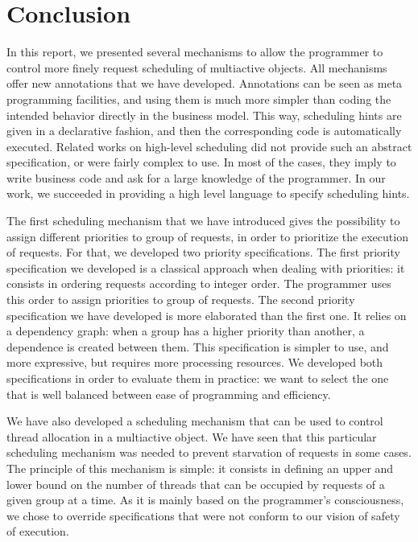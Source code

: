 \documentclass[11pt]{report}
\begin{document}
\section{Conclusion}
In this report, we presented several mechanisms to allow the programmer to control more finely request scheduling of multiactive objects. All mechanisms offer new annotations that we have developed. Annotations can be seen as meta programming facilities, and using them is much more simpler than coding the intended behavior directly in the business model. This way, scheduling hints are given in a declarative fashion, and then the corresponding code is automatically executed. Related works on high-level scheduling did not provide such an abstract specification, or were fairly complex to use. In most of the cases, they imply to write business code and ask for a large knowledge of the programmer. In our work, we succeeded in providing a high level language to specify scheduling hints.

The first scheduling mechanism that we have introduced gives the possibility to assign different priorities to group of requests, in order to prioritize the execution of requests. For that, we developed two priority specifications. The first priority specification we developed is a classical approach when dealing with priorities: it consists in ordering requests according to integer order. The programmer uses this order to assign priorities to group of requests. The second priority specification we have developed is more elaborated than the first one. It relies on a dependency graph: when a group has a higher priority than another, a dependence is created between them. This specification is simpler to use, and more expressive, but requires more processing resources. We developed both specifications in order to evaluate them in practice: we want to select the one that is well balanced between ease of programming and efficiency.

We have also developed a scheduling mechanism that can be used to control thread allocation in a multiactive object. We have seen that this particular scheduling mechanism was needed to prevent starvation of requests in some cases. The principle of this mechanism is simple: it consists in defining an upper and lower bound on the number of threads that can be occupied by requests of a given group at a time. As it is mainly based on the programmer's consciousness, we chose to override specifications that were not conform to our vision of safety of execution.
\end{document}
